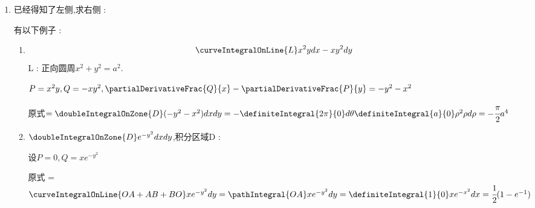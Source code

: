 {{{\begin{enumerate}
{              还有一种可能的取值是$A = \curveIntegralOnLine{L}xdy = -\curveIntegralOnLine{L}ydx = \cfrac{1}{2}\curveIntegralOnLine{L}(-ydx + xdy)$

              即 : 设$P = -y,Q = x,\partialDerivativeFrac{Q}{x} = 1,\partialDerivativeFrac{P}{y} = -1$

              那么$2\doubleIntegralOnZone{D}dxdy = \curveIntegralOnLine{L}xdy - ydx$

              所以$A = \cfrac{1}{2}\curveIntegralOnLine{L}xdy - ydx$

              $A$:积分区域面积
              }
        \item {
              已经得知了左侧,求右侧 :

              有以下例子 :
              \begin{enumerate}
                \item {
                      $$
                        \curveIntegralOnLine{L}x^2ydx - xy^2dy
                      $$
                      L : 正向圆周$x^2 + y^2 = a^2$.

                      $P = x^2y,Q =-xy^2,\partialDerivativeFrac{Q}{x} - \partialDerivativeFrac{P}{y} = -y^2-x^2$

                      原式$=\doubleIntegralOnZone{D}(-y^2-x^2)dxdy = -\definiteIntegral{2\pi}{0}d\theta\definiteIntegral{a}{0}\rho^2\rho d\rho = -\cfrac{\pi}{2}a^4$
                      }
                \item {
                      $\doubleIntegralOnZone{D}e^{-y^2}dxdy$,积分区域D : 

                      设$P = 0,Q = xe^{-y^2}$

                      原式 = \begin{math}
                        \curveIntegralOnLine{OA + AB + BO}xe^{-y^2}dy \\
                        =\pathIntegral{OA}xe^{-y^2}dy \\
                        =\definiteIntegral{1}{0}xe^{-x^2}dx \\
                        =\cfrac{1}{2}(1 - e^{-1})
                      \end{math}

}
\end{enumerate}}
\end{enumerate}}}}
